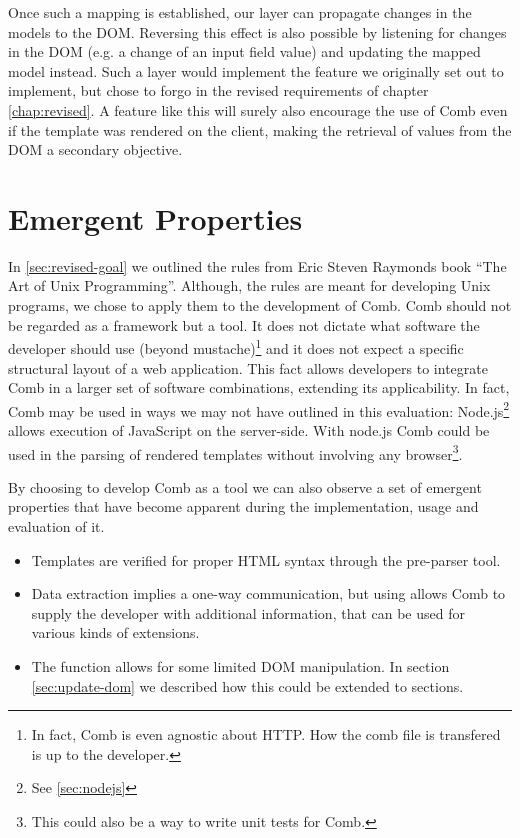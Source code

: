 \documentclass[thesis.tex]{subfiles}
\begin{document}
Once such a mapping is established, our layer can propagate changes in the
models to the DOM. Reversing this effect is also possible by listening for
changes in the DOM (e.g. a change of an input field value) and updating the
mapped model instead.
Such a layer would implement the feature we originally set out to implement,
but chose to forgo in the revised requirements of chapter \ref{chap:revised}.
A feature like this will surely also encourage the use of Comb even if the
template was rendered on the client, making the retrieval of values from the DOM
a secondary objective.



\section{Emergent Properties}
\label{sec:emergent}
In \ref{sec:revised-goal} we outlined the rules from Eric Steven Raymonds book
``The Art of Unix Programming''. Although, the rules are meant for developing
Unix programs, we chose to apply them to the development of Comb.
Comb should not be regarded as a framework but a tool. It does not dictate what
software the developer should use (beyond mustache)\footnote{
	In fact, Comb is even agnostic about HTTP. How the comb file is transfered
	is up to the developer.
} and it does not expect a specific structural layout of a web application.
This fact allows developers to integrate Comb in a larger set of software
combinations, extending its applicability.
In fact, Comb may be used in ways we may not have outlined in this evaluation:
Node.js\footnote{See \ref{sec:nodejs}} allows execution of JavaScript on the
server-side. With node.js Comb could be used in the parsing of rendered
templates without involving any browser\footnote{
	This could also be a way to write unit tests for Comb.
}.

By choosing to develop Comb as a tool we can also observe a set of emergent
properties that have become apparent during the implementation, usage and
evaluation of it.

\begin{itemize}
\item Templates are verified for proper HTML syntax through the pre-parser tool.
\item Data extraction implies a one-way communication, but using
       allows Comb to supply the developer with additional
      information, that can be used for various kinds of extensions.
\item The  function allows for some limited DOM manipulation.
      In section \ref{sec:update-dom} we described how this could be extended to
      sections.
\end{itemize}
\end{document}
